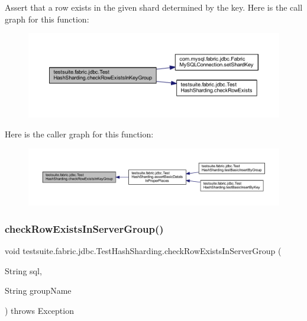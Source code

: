 Assert that a row exists in the given shard determined by the key. Here is the call graph for this function\+:
\nopagebreak
\begin{figure}[H]
\begin{center}
\leavevmode
\includegraphics[width=350pt]{classtestsuite_1_1fabric_1_1jdbc_1_1_test_hash_sharding_a004334f5d0b85fae53d4d2034457dd84_cgraph}
\end{center}
\end{figure}
Here is the caller graph for this function\+:
\nopagebreak
\begin{figure}[H]
\begin{center}
\leavevmode
\includegraphics[width=350pt]{classtestsuite_1_1fabric_1_1jdbc_1_1_test_hash_sharding_a004334f5d0b85fae53d4d2034457dd84_icgraph}
\end{center}
\end{figure}
\mbox{\label{classtestsuite_1_1fabric_1_1jdbc_1_1_test_hash_sharding_a9d7cbb774663dec35a3f486d09f5d124}} 
\subsubsection{\texorpdfstring{check\+Row\+Exists\+In\+Server\+Group()}{checkRowExistsInServerGroup()}}
{\footnotesize\ttfamily void testsuite.\+fabric.\+jdbc.\+Test\+Hash\+Sharding.\+check\+Row\+Exists\+In\+Server\+Group (\begin{DoxyParamCaption}\item[{String}]{sql,  }\item[{String}]{group\+Name }\end{DoxyParamCaption}) throws Exception\hspace{0.3cm}{\ttfamily [protected]}}

